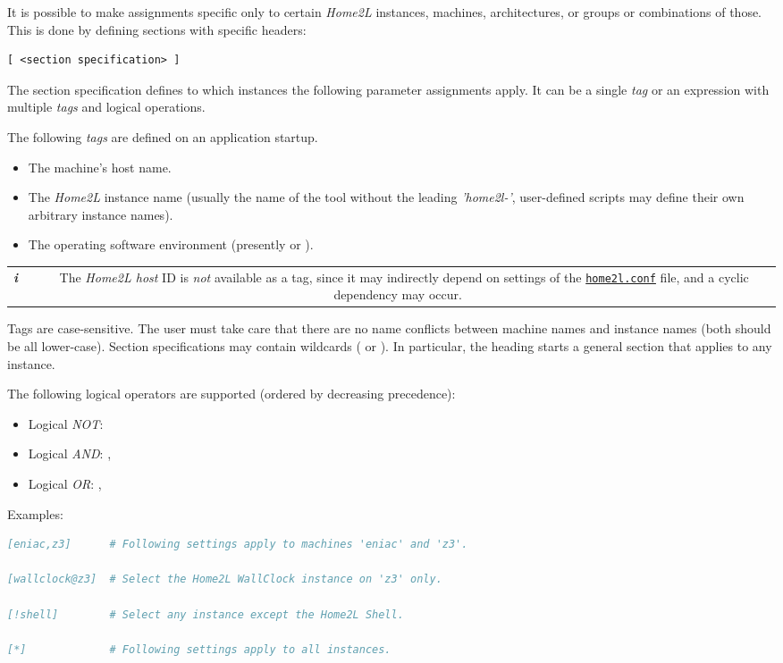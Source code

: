 \documentclass[12pt,english,parskip=half,headheight=19pt]{scrreprt}
\newcommand{\lst}[1]{\colorbox{lstbackground}{\footnotesize\code{#1}}}
\newcommand{\infobox}[1]{
  \par
  \medskip
  \hfill
  \setlength\arrayrulewidth{1pt}
  \begin{tabular}[t]{c|c|}
    \parbox{1.8em}{\hfill\textit{\Huge\textbf{i}\,}}
    &
    \,\parbox{0.89\linewidth}{\setlength{\parskip}{0.5em} \small #1}\,
  \end{tabular}
  \medskip
  \par
}
\newcommand{\idx}[1]{#1\index{#1}}
\newcommand{\reftool}[1]{\hyperref[tool:#1]{\texttt{\idx{#1}}}}
\begin{document}
It is possible to make assignments specific only to certain \textit{Home2L} instances, machines, architectures, or groups or combinations of those. This is done by defining sections with specific headers:
\begin{lstlisting}
[ <section specification> ]
\end{lstlisting}

The section specification defines to which instances the following parameter assignments apply.
It can be a single \textit{tag} or an expression with multiple \textit{tags} and logical operations.

The following \textit{tags} are defined on an application startup.

\begin{itemize}
\item
  The machine's host name.
\item
  The \textit{Home2L} instance name (usually the name of the tool without
  the leading \textit{'home2l-'}, user-defined scripts may define their
  own arbitrary instance names).
\item
  The operating software environment (presently \lst{Debian} or \lst{Android}).
\end{itemize}

\infobox{
  The \textit{Home2L host} ID is \textit{not} available as a tag, since it
  may indirectly depend on settings of the \reftool{home2l.conf} file,
  and a cyclic dependency may occur.
}

Tags are case-sensitive. The user must take care that there are no name
conflicts between machine names and instance names (both should be all
lower-case). Section specifications may contain wildcards (\lst{*} or \lst{?}). In
particular, the heading \lst{[*]} starts a general section that
applies to any instance.

The following logical operators are supported (ordered by decreasing precedence):

\begin{itemize}
\item
  Logical \textit{NOT}: \lst{!}
\item
  Logical \textit{AND}: \lst{&}, \lst{@}
\item
  Logical \textit{OR}:  \lst{,}, \lst{+}
\end{itemize}

Examples:
\begin{lstlisting}[language=comments]
[eniac,z3]      # Following settings apply to machines 'eniac' and 'z3'.

[wallclock@z3]  # Select the Home2L WallClock instance on 'z3' only.

[!shell]        # Select any instance except the Home2L Shell.

[*]             # Following settings apply to all instances.
\end{lstlisting}
\end{document}
